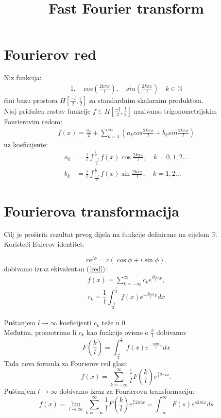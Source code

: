 \documentclass{article}
\title{Fast Fourier transform}
\begin{document}
\section{Fourierov red}
Niz funkcija: 
\begin{align*}
1,\quad cos \left( \frac{2 k \pi x}{l} \right),\quad sin \left(\frac{2 k \pi x}{l}\right)\quad  \text{$k \in \mathbb{N}$}
\end{align*}
čini bazu prostora $H\left[ \frac{−l}{2}, \frac{l}{2}\right]$ sa standardnim skalarnim produktom. \\
Njoj pridužen rastav funkcije $f \in H\left[ \frac{−l}{2}, \frac{l}{2}\right]$ nazivamo
trigonometrijskim Fourierovim redom:
\begin{align} \label{red}
 f(x) = \frac{a_0}{2} + \sum_{k=1}^{\infty} \left( a_k cos \frac{2 k \pi x}{l} + b_k sin \frac{2k \pi x}{l} \right) 
\end{align}
uz koeficijente:
\[\begin{aligned}
a_{k} &=\frac{1}{l} \int_{\frac{-l}{2}}^{\frac{l}{2}} f(x) \cos \frac{2 k \pi x}{l}, \quad k=0,1,2 \ldots \\
b_{k} &=\frac{1}{l} \int_{\frac{-l}{2}}^{\frac{l}{2}} f(x) \sin \frac{2 k \pi x}{l}, \quad k=1,2 \ldots
\end{aligned}\]

\section{Fourierova transformacija}
Cilj je proširiti rezultat prvog dijela na funkcije definirane na cijelom $\mathbb{R}$.\\ 
Koristeći Eulerov identitet:

\[ r e^{i\phi}=r(\cos{\phi}+i\sin{\phi}).\]
dobivamo izraz ekivalentan (\ref{red}):
\begin{align} \label{transformacija}
 f(x)=\sum_{k=-\infty}^{\infty}{c_{k} e^{ \frac{2k\pi i}{l}x} }, 
\end{align}
\[c_{k}=\frac{1}{l}\int_{\frac{-l}{2}}^{\frac{l}{2}}{f(x)e^{-\frac{2k\pi i}{l}x}dx}\] \\
Puštanjem $l \rightarrow \infty$ koeficijenti $c_k$ teže u $0$.\\
Međutim, promotrimo li $c_k$ kao funkcije ovisne o $\frac{k}{l}$ dobivamo:
\[
F\left(\frac{k}{l}\right)=\int_{\frac{-l}{2}}^{\frac{l}{2}}{f(x)e^{-\frac{2k\pi i}{l}x}dx}
\]
Tada nova formula za Fourierov red glasi:
\[
f(x)=\sum_{k=-\infty}^{\infty}{\frac{1}{l}F\left(\frac{k}{l}\right) e^{\frac{k}{l} 2\pi i x }}.
\]
Puštanjem $l \rightarrow \infty$ dobivamo izraz za Fourierovu transformaciju:
\[
f(x)= \lim_{l \to \infty} \sum_{k=-\infty}^{\infty}{\frac{1}{l}F\left(\frac{k}{l}\right) e^{\frac{k}{l} 2\pi ix}} = \int_{- \infty}^{ \infty}{F(s)e^{s 2\pi ix}ds}
\]
\end{document}

